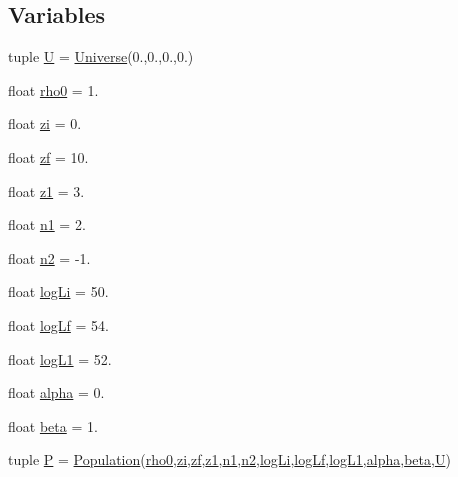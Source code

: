 \subsection*{Variables}
\begin{DoxyCompactItemize}
\item 
tuple \hyperlink{namespacegrbsim_aa8175e808cca57d0b43c3f360b6a2c8b}{U} = \hyperlink{classgrbsim_1_1_universe}{Universe}(0.,0.,0.,0.)
\item 
float \hyperlink{namespacegrbsim_a121f590c69146cbb7aaef7e00640fd7a}{rho0} = 1.
\item 
float \hyperlink{namespacegrbsim_a2dc4a4cc63263968b10c425626689c6d}{zi} = 0.
\item 
float \hyperlink{namespacegrbsim_a020eec795706880dd65d924032f26397}{zf} = 10.
\item 
float \hyperlink{namespacegrbsim_aba9a7720313a09fb6252d13deeb5098b}{z1} = 3.
\item 
float \hyperlink{namespacegrbsim_a871af59fd84dd91b02e9d2af01051d57}{n1} = 2.
\item 
float \hyperlink{namespacegrbsim_a8bf076e9bb69f278884b158093fa55c3}{n2} = -\/1.
\item 
float \hyperlink{namespacegrbsim_a943574d69a85e735365eff8cf657ccc7}{log\-Li} = 50.
\item 
float \hyperlink{namespacegrbsim_a515d46acf1133ef8db408bfb7c993086}{log\-Lf} = 54.
\item 
float \hyperlink{namespacegrbsim_a4e99c840af19a77b589f1eab0300d65e}{log\-L1} = 52.
\item 
float \hyperlink{namespacegrbsim_a1cddfb278523caef508cda8170273f5a}{alpha} = 0.
\item 
float \hyperlink{namespacegrbsim_a057e0c49b2a8f4242d3873363f85a4f6}{beta} = 1.
\item 
tuple \hyperlink{namespacegrbsim_a6ad6e8e40932a7008d72c4ea47741199}{P} = \hyperlink{classgrbsim_1_1_population}{Population}(\hyperlink{namespacegrbsim_a121f590c69146cbb7aaef7e00640fd7a}{rho0},\hyperlink{namespacegrbsim_a2dc4a4cc63263968b10c425626689c6d}{zi},\hyperlink{namespacegrbsim_a020eec795706880dd65d924032f26397}{zf},\hyperlink{namespacegrbsim_aba9a7720313a09fb6252d13deeb5098b}{z1},\hyperlink{namespacegrbsim_a871af59fd84dd91b02e9d2af01051d57}{n1},\hyperlink{namespacegrbsim_a8bf076e9bb69f278884b158093fa55c3}{n2},\hyperlink{namespacegrbsim_a943574d69a85e735365eff8cf657ccc7}{log\-Li},\hyperlink{namespacegrbsim_a515d46acf1133ef8db408bfb7c993086}{log\-Lf},\hyperlink{namespacegrbsim_a4e99c840af19a77b589f1eab0300d65e}{log\-L1},\hyperlink{namespacegrbsim_a1cddfb278523caef508cda8170273f5a}{alpha},\hyperlink{namespacegrbsim_a057e0c49b2a8f4242d3873363f85a4f6}{beta},\hyperlink{namespacegrbsim_aa8175e808cca57d0b43c3f360b6a2c8b}{U})

\end{DoxyCompactItemize}
